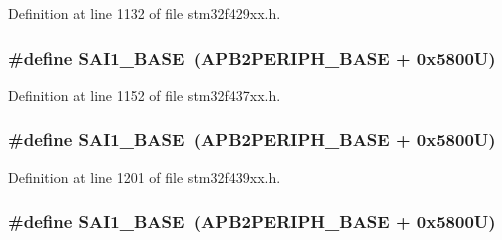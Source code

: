 Definition at line 1132 of file stm32f429xx.\+h.

\subsubsection[{\texorpdfstring{S\+A\+I1\+\_\+\+B\+A\+SE}{SAI1_BASE}}]{\setlength{\rightskip}{0pt plus 5cm}\#define S\+A\+I1\+\_\+\+B\+A\+SE~({\bf A\+P\+B2\+P\+E\+R\+I\+P\+H\+\_\+\+B\+A\+SE} + 0x5800\+U)}\hypertarget{group___peripheral__memory__map_ga24c1053b754946b512f9c31123e09d21}{}\label{group___peripheral__memory__map_ga24c1053b754946b512f9c31123e09d21}


Definition at line 1152 of file stm32f437xx.\+h.

\subsubsection[{\texorpdfstring{S\+A\+I1\+\_\+\+B\+A\+SE}{SAI1_BASE}}]{\setlength{\rightskip}{0pt plus 5cm}\#define S\+A\+I1\+\_\+\+B\+A\+SE~({\bf A\+P\+B2\+P\+E\+R\+I\+P\+H\+\_\+\+B\+A\+SE} + 0x5800\+U)}\hypertarget{group___peripheral__memory__map_ga24c1053b754946b512f9c31123e09d21}{}\label{group___peripheral__memory__map_ga24c1053b754946b512f9c31123e09d21}


Definition at line 1201 of file stm32f439xx.\+h.

\subsubsection[{\texorpdfstring{S\+A\+I1\+\_\+\+B\+A\+SE}{SAI1_BASE}}]{\setlength{\rightskip}{0pt plus 5cm}\#define S\+A\+I1\+\_\+\+B\+A\+SE~({\bf A\+P\+B2\+P\+E\+R\+I\+P\+H\+\_\+\+B\+A\+SE} + 0x5800\+U)}\hypertarget{group___peripheral__memory__map_ga24c1053b754946b512f9c31123e09d21}{}\label{group___peripheral__memory__map_ga24c1053b754946b512f9c31123e09d21}


